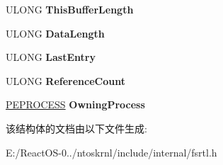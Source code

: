 \begin{DoxyCompactItemize}
U\+L\+O\+NG {\bfseries This\+Buffer\+Length}
\item 
\mbox{\label{struct___n_o_t_i_f_y___c_h_a_n_g_e_a947f15101c0b49079ca2a994ce67527e}} 
U\+L\+O\+NG {\bfseries Data\+Length}
\item 
\mbox{\label{struct___n_o_t_i_f_y___c_h_a_n_g_e_a981339806c4b55ae22b9a98e53bb05c4}} 
U\+L\+O\+NG {\bfseries Last\+Entry}
\item 
\mbox{\label{struct___n_o_t_i_f_y___c_h_a_n_g_e_aac2672f2e10ae46cc6db722cdb39159f}} 
U\+L\+O\+NG {\bfseries Reference\+Count}
\item 
\mbox{\label{struct___n_o_t_i_f_y___c_h_a_n_g_e_a7903c5dd5954e1c06ce635181edb01c6}} 
\hyperlink{struct___e_p_r_o_c_e_s_s}{P\+E\+P\+R\+O\+C\+E\+SS} {\bfseries Owning\+Process}
\end{DoxyCompactItemize}


该结构体的文档由以下文件生成\+:\begin{DoxyCompactItemize}
\item 
E\+:/\+React\+O\+S-\/0../ntoskrnl/include/internal/fsrtl.\+h\end{DoxyCompactItemize}
